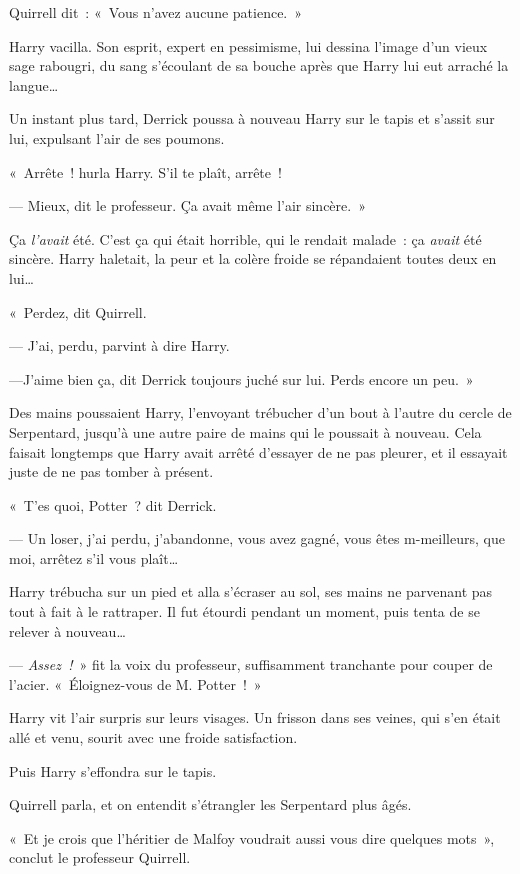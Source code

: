 Quirrell dit~: «~Vous n'avez aucune patience.~»

Harry vacilla.
Son esprit, expert en pessimisme, lui dessina l'image d'un vieux sage rabougri, du sang s'écoulant de sa bouche après que Harry lui eut arraché la langue…

Un instant plus tard, Derrick poussa à nouveau Harry sur le tapis et s'assit sur lui, expulsant l'air de ses poumons.

«~Arrête~! hurla Harry.
S'il te plaît, arrête~!

--- Mieux, dit le professeur. Ça avait même l'air sincère.~»

Ça \emph{l'avait} été.
C'est ça qui était horrible, qui le rendait malade~: ça \emph{avait} été sincère.
Harry haletait, la peur et la colère froide se répandaient toutes deux en lui…

«~Perdez, dit Quirrell.

--- J'ai, perdu, parvint à dire Harry.

---J'aime bien ça, dit Derrick toujours juché sur lui.
Perds encore un peu.~»

\later

Des mains poussaient Harry, l'envoyant trébucher d'un bout à l'autre du cercle de Serpentard, jusqu'à une autre paire de mains qui le poussait à nouveau.
Cela faisait longtemps que Harry avait arrêté d'essayer de ne pas pleurer, et il essayait juste de ne pas tomber à présent.

«~T'es quoi, Potter~? dit Derrick.

--- Un loser, j'ai perdu, j'abandonne, vous avez gagné, vous êtes m-meilleurs, que moi, arrêtez s'il vous plaît…

Harry trébucha sur un pied et alla s'écraser au sol, ses mains ne parvenant pas tout à fait à le rattraper.
Il fut étourdi pendant un moment, puis tenta de se relever à nouveau…

--- \emph{Assez~!}~» fit la voix du professeur, suffisamment tranchante pour couper de l'acier.
«~Éloignez-vous de M. Potter~!~»

Harry vit l'air surpris sur leurs visages.
Un frisson dans ses veines, qui s'en était allé et venu, sourit avec une froide satisfaction.

Puis Harry s'effondra sur le tapis.

Quirrell parla, et on entendit s'étrangler les Serpentard plus âgés.

«~Et je crois que l'héritier de Malfoy voudrait aussi vous dire quelques mots~», conclut le professeur Quirrell.

